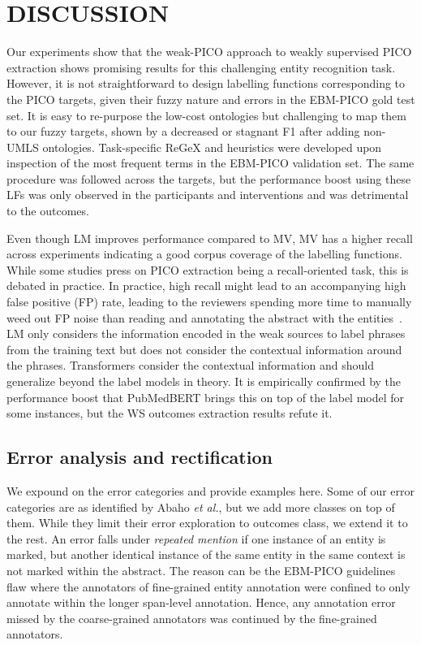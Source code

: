 \documentclass[10.7pt,]{article}
\begin{document}
\section{DISCUSSION}\label{discussion}
%
Our experiments show that the weak-PICO approach to weakly supervised PICO extraction shows promising results for this challenging entity recognition task.
However, it is not straightforward to design labelling functions corresponding to the PICO targets, given their fuzzy nature and errors in the EBM-PICO gold test set.
It is easy to re-purpose the low-cost ontologies but challenging to map them to our fuzzy targets, shown by a decreased or stagnant F1 after adding non-UMLS ontologies.
Task-specific ReGeX and heuristics were developed upon inspection of the most frequent terms in the EBM-PICO validation set.
The same procedure was followed across the targets, but the performance boost using these LFs was only observed in the participants and interventions and was detrimental to the outcomes.

Even though LM improves performance compared to MV, MV has a higher recall across experiments indicating a good corpus coverage of the labelling functions.
While some studies press on PICO extraction being a recall-oriented task, this is debated in practice.
In practice, high recall might lead to an accompanying high false positive (FP) rate, leading to the reviewers spending more time to manually weed out FP noise than reading and annotating the abstract with the entities~\cite{liu2021sent2span}.
LM only considers the information encoded in the weak sources to label phrases from the training text but does not consider the contextual information around the phrases.
Transformers consider the contextual information and should generalize beyond the label models in theory.
It is empirically confirmed by the performance boost that PubMedBERT brings this on top of the label model for some instances, but the WS outcomes extraction results refute it.
%
\subsection{Error analysis and rectification}\label{err_ana}
%
We expound on the error categories and provide examples here.
Some of our error categories are as identified by Abaho \textit{et al.}, but we add more classes on top of them.
While they limit their error exploration to outcomes class, we extend it to the rest.
An error falls under \textit{repeated mention} if one instance of an entity is marked, but another identical instance of the same entity in the same context is not marked within the abstract. 
The reason can be the EBM-PICO guidelines flaw where the annotators of fine-grained entity annotation were confined to only annotate within the longer span-level annotation.
Hence, any annotation error missed by the coarse-grained annotators was continued by the fine-grained annotators.
\end{document}
